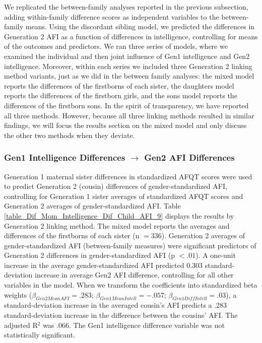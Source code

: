 We replicated the between-family analyses reported in the previous subsection, adding within-family difference scores as independent variables to the between-family means. Using the discordant sibling model, we predicted the differences in Generation 2 AFI as a function of differences in intelligence, controlling for means of the outcomes and predictors. We ran three series of models, where we examined the individual and then joint influence of Gen1 intelligence and Gen2 intelligence. Moreover, within each series we included three Generation 2 linking method variants, just as we did in the between family analyses: the mixed model reports the differences of the firstborns of each sister, the daughters model reports the differences of the firstborn girls, and the sons model reports the differences of the firstborn sons. In the spirit of transparency, we have reported all three methods. However, because all three linking methods resulted in similar findings, we will focus the results section on the mixed model and only discuss the other two methods when they deviate.

\subsubsection{Gen1 Intelligence Differences $\rightarrow$ Gen2 AFI Differences} 
Generation 1 maternal sister differences in standardized AFQT scores were used to predict Generation 2 (cousin) differences of gender-standardized AFI, controlling for Generation 1 sister averages of standardized AFQT scores and Generation 2 averages of gender-standardized AFI. Table \ref{table_Dif_Mom_Intelligence_Dif_Child_AFI_9} displays the results by Generation 2 linking method. The mixed model reports the averages and differences of the firstborns of each sister (n $= 336$). Generation 2 averages of gender-standardized AFI (between-family measures) were significant predictors of Generation 2 differences in gender-standardized AFI (p $< .01$). A one-unit increase in the average gender-standardized AFI predicted $0.303$ standard-deviation increase in average Gen2 AFI difference, controlling for all other variables in the model. When we transform the coefficients into standardized beta weights ($\beta_{Gen2 Mean AFI} = .283$; $\beta_{Gen1 Mean Intell} = -.057$; $\beta_{Gen1 Diff Intell} = .03$), a standard-deviation increase in the averaged cousin's AFI predicts a .283 standard-deviation increase in the difference between the cousins' AFI. The adjusted R$^{2}$ was .066. The Gen1 intelligence difference variable was not statistically significant.

